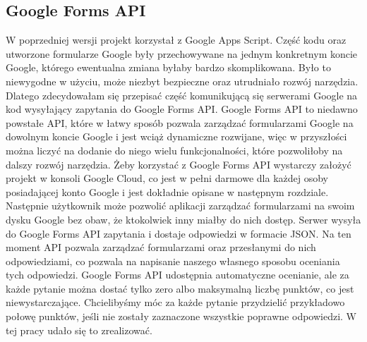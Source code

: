 \subsection{Google Forms API}
W poprzedniej wersji projekt korzystał z Google Apps Script. Część kodu oraz utworzone
formularze Google były przechowywane na jednym konkretnym koncie Google, którego ewentualna
zmiana byłaby bardzo skomplikowana. Było to niewygodne w użyciu, może niezbyt bezpieczne
oraz utrudniało rozwój narzędzia. Dlatego zdecydowałam się przepisać część komunikującą się
serwerami Google na kod wysyłający zapytania do Google Forms API. Google Forms API to niedawno
powstałe API, które w łatwy sposób pozwala zarządzać formularzami Google na dowolnym koncie
Google i jest wciąż dynamiczne rozwijane, więc w przyszłości można liczyć na dodanie do niego
wielu funkcjonalności, które pozwoliłoby na dalszy rozwój narzędzia.
Żeby korzystać z Google Forms API wystarczy założyć projekt w konsoli Google Cloud, co jest w pełni
darmowe dla każdej osoby posiadającej konto Google i jest dokładnie opisane w następnym rozdziale.
Następnie użytkownik może pozwolić aplikacji zarządzać formularzami na swoim dysku Google bez obaw, 
że ktokolwiek inny miałby do nich dostęp. Serwer wysyła do Google Forms API zapytania i dostaje
 odpowiedzi w formacie JSON. Na ten moment API pozwala zarządzać formularzami oraz
przesłanymi do nich odpowiedziami, co pozwala na napisanie naszego własnego sposobu oceniania tych
odpowiedzi. Google Forms API udostępnia automatyczne ocenianie, ale za każde pytanie można
dostać tylko zero albo maksymalną liczbę punktów, co jest niewystarczające. Chcielibyśmy móc
za każde pytanie przydzielić przykładowo połowę punktów, jeśli nie zostały zaznaczone wszystkie
poprawne odpowiedzi. W tej pracy udało się to zrealizować.


